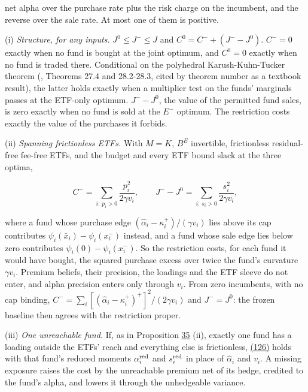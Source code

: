 \documentclass[11pt]{article}
\begin{document}
net alpha over the purchase rate plus the risk charge on the incumbent,
and the reverse over the sale rate. At most one of them is positive.

(i) \emph{Structure, for any inputs.} \(J^0\leq J^-\leq J\) and
\(C^0=C^-+(J^--J^0)\). \(C^-=0\) exactly when no fund is bought at the joint
optimum, and \(C^0=0\) exactly when no fund is traded there. Conditional
on the polyhedral Karush-Kuhn-Tucker theorem (\cite{rockafellar1970convex},
Theorems 27.4 and 28.2-28.3, cited by theorem number as a textbook
result), the latter holds exactly when a multiplier test on the funds'
marginals passes at the ETF-only optimum. \(J^--J^0\), the value of the
permitted fund sales, is zero exactly when no fund is sold at the \(E^-\)
optimum. The restriction costs exactly the value of the purchases it
forbids.

(ii) \emph{Spanning frictionless ETFs.} With \(M=K\), \(B^E\) invertible,
frictionless residual-free fee-free ETFs, and the budget and every ETF
bound slack at the three optima,

\begin{equation*}
C^-=\sum_{i:\,p_i>0}\frac{p_i^2}{2\gamma v_i},\qquad
J^--J^0=\sum_{i:\,s_i>0}\frac{s_i^2}{2\gamma v_i},\tag{126}\label{eq:126}
\end{equation*}

where a fund whose purchase edge \((\hat\alpha_i-\kappa^+_i)/(\gamma v_i)\) lies above its cap
contributes \(\psi_i(\bar x_i)-\psi_i(x^-_i)\) instead, and a fund whose sale edge lies
below zero contributes \(\psi_i(0)-\psi_i(x^-_i)\). So the restriction costs, for
each fund it would have bought, the squared purchase excess over twice
the fund's curvature \(\gamma v_i\). Premium beliefs, their precision, the
loadings and the ETF sleeve do not enter, and alpha precision enters
only through \(v_i\). From zero incumbents, with no cap binding,
\(C^-=\sum_i[(\hat\alpha_i-\kappa^+_i)^+]^2/(2\gamma v_i)\) and \(J^-=J^0\): the frozen baseline then agrees
with the restriction proper.

(iii) \emph{One unreachable fund.} If, as in Proposition \hyperref[res:Proposition-35]{35} (ii), exactly one
fund has a loading outside the ETFs' reach and everything else is
frictionless, \hyperref[eq:126]{(126)} holds with that fund's reduced moments \(\alpha^{\rm red}_i\) and
\(s^{\rm red}_i\) in place of \(\hat\alpha_i\) and \(v_i\). A missing exposure raises the cost by
the unreachable premium net of its hedge, credited to the fund's
alpha, and lowers it through the unhedgeable variance.
\end{document}
